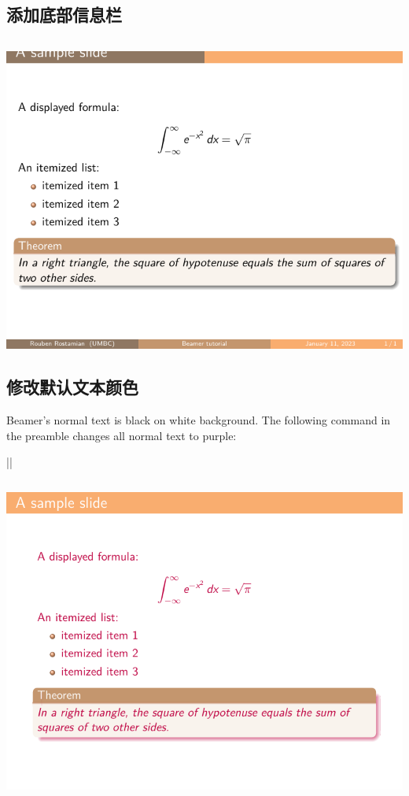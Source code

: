 \begin{column}{0.5\textwidth}
\subsection{添加底部信息栏}

\inputminted[linenos=true]{latex}{examples/beamer/beamertheme06.tex}

\includegraphics{examples/beamer/beamertheme06.pdf}

\subsection{修改默认文本颜色}

Beamer’s normal text is black on white background. The following command in the preamble changes all normal text to purple:

||

\inputminted[linenos=true]{latex}{examples/beamer/beamertheme07.tex}

\includegraphics{examples/beamer/beamertheme07.pdf}


\end{column}

